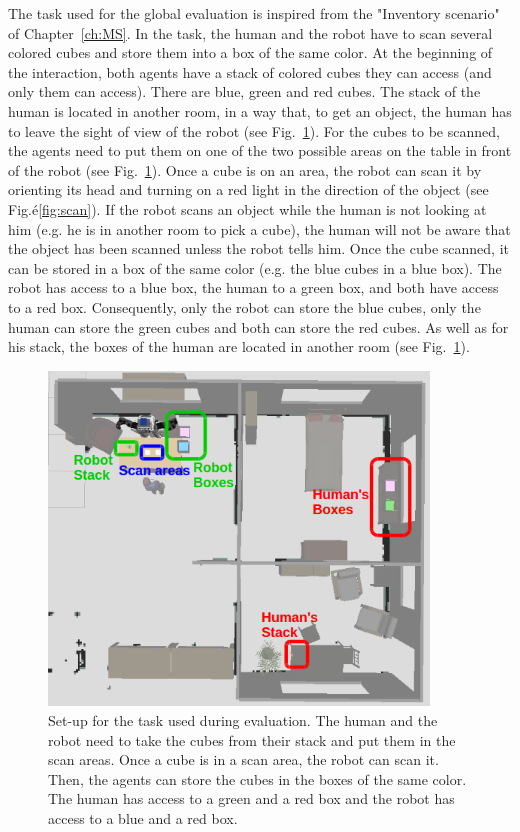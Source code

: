 \documentclass[english,a4paper,11pt,twoside]{StyleThese}
\begin{document}
The task used for the global evaluation is inspired from the "Inventory scenario" of Chapter~\ref{ch:MS}. In the task, the human and the robot have to scan several colored cubes and store them into a box of the same color. At the beginning of the interaction, both agents have a stack of colored cubes they can access (and only them can access). There are blue, green and red cubes. The stack of the human is located in another room, in a way that, to get an object, the human has to leave the sight of view of the robot (see Fig.~\ref{fig:setUpSimu}). For the cubes to be scanned, the agents need to put them on one of the two possible areas on the table in front of the robot (see Fig.~\ref{fig:setUpSimu}). Once a cube is on an area, the robot can scan it by orienting its head and turning on a red light in the direction of the object (see Fig.é\ref{fig:scan}). If the robot scans an object while the human is not looking at him (e.g. he is in another room to pick a cube), the human will not be aware that the object has been scanned unless the robot tells him. Once the cube scanned, it can be stored in a box of the same color (e.g. the blue cubes in a blue box). The robot has access to a blue box, the human to a green box, and both have access to a red box. Consequently, only the robot can store the blue cubes, only the human can store the green cubes and both can store the red cubes. As well as for his stack, the boxes of the human are located in another room (see Fig.~\ref{fig:setUpSimu}). 


\begin{figure}[!h]
	\centering
    \includegraphics[width=0.9\textwidth]{figs/Chapter5/SetUpSimu.png}
    \caption{Set-up for the task used during evaluation. The human and the robot need to take the cubes from their stack and put them in the scan areas. Once a cube is in a scan area, the robot can scan it. Then, the agents can store the cubes in the boxes of the same color. The human has access to a green and a red box and the robot has access to a blue and a red box.}
    \label{fig:setUpSimu}
\end{figure}
\end{document}
